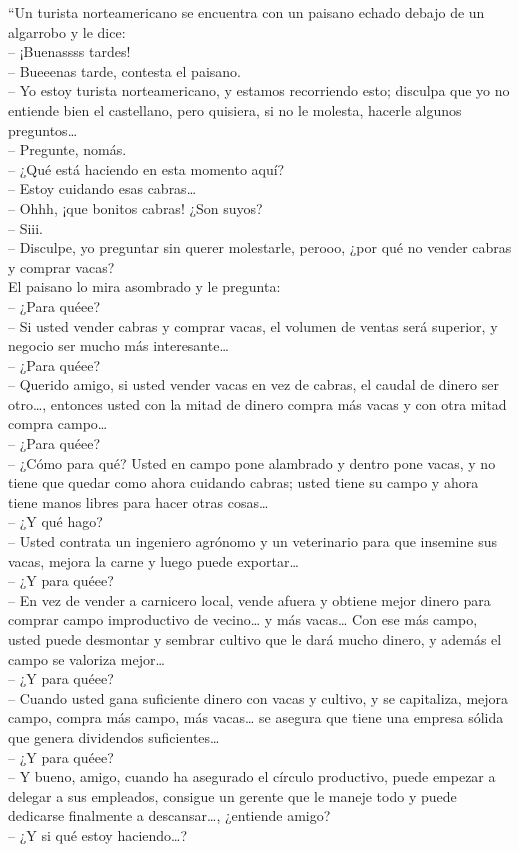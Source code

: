 \documentclass[
]{article}
\begin{document}
``Un turista norteamericano se encuentra con un paisano echado debajo de
un algarrobo y le dice:\\
-- ¡Buenassss tardes!\\
-- Bueeenas tarde, contesta el paisano.\\
-- Yo estoy turista norteamericano, y estamos recorriendo esto; disculpa
que yo no entiende bien el castellano, pero quisiera, si no le molesta,
hacerle algunos preguntos\ldots{}\\
-- Pregunte, nomás.\\
-- ¿Qué está haciendo en esta momento aquí?\\
-- Estoy cuidando esas cabras\ldots{}\\
-- Ohhh, ¡que bonitos cabras! ¿Son suyos?\\
-- Siii.\\
-- Disculpe, yo preguntar sin querer molestarle, perooo, ¿por qué no
vender cabras y comprar vacas?\\
El paisano lo mira asombrado y le pregunta:\\
-- ¿Para quéee?\\
-- Si usted vender cabras y comprar vacas, el volumen de ventas será
superior, y negocio ser mucho más interesante\ldots{}\\
-- ¿Para quéee?\\
-- Querido amigo, si usted vender vacas en vez de cabras, el caudal de
dinero ser otro\ldots, entonces usted con la mitad de dinero compra más
vacas y con otra mitad compra campo\ldots{}\\
-- ¿Para quéee?\\
-- ¿Cómo para qué? Usted en campo pone alambrado y dentro pone vacas, y
no tiene que quedar como ahora cuidando cabras; usted tiene su campo y
ahora tiene manos libres para hacer otras cosas\ldots{}\\
-- ¿Y qué hago?\\
-- Usted contrata un ingeniero agrónomo y un veterinario para que
insemine sus vacas, mejora la carne y luego puede exportar\ldots{}\\
-- ¿Y para quéee?\\
-- En vez de vender a carnicero local, vende afuera y obtiene mejor
dinero para comprar campo improductivo de vecino\ldots{} y más
vacas\ldots{} Con ese más campo, usted puede desmontar y sembrar cultivo
que le dará mucho dinero, y además el campo se valoriza mejor\ldots{}\\
-- ¿Y para quéee?\\
-- Cuando usted gana suficiente dinero con vacas y cultivo, y se
capitaliza, mejora campo, compra más campo, más vacas\ldots{} se asegura
que tiene una empresa sólida que genera dividendos suficientes\ldots{}\\
-- ¿Y para quéee?\\
-- Y bueno, amigo, cuando ha asegurado el círculo productivo, puede
empezar a delegar a sus empleados, consigue un gerente que le maneje
todo y puede dedicarse finalmente a descansar\ldots, ¿entiende amigo?\\
-- ¿Y si qué estoy haciendo\ldots?
\end{document}
